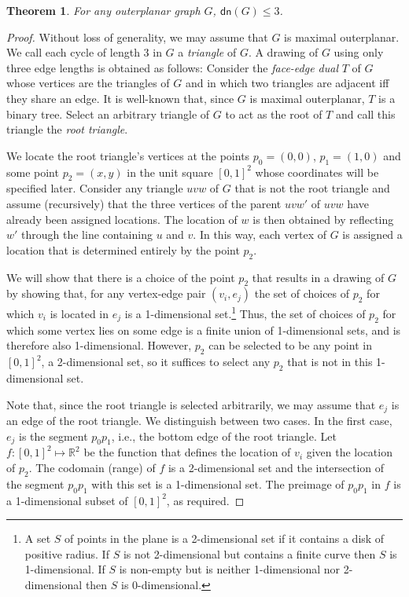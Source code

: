 \documentclass{article}
\newtheorem{thm}{Theorem}
\newcommand{\dn}{\mathsf{dn}}
\begin{document}
\begin{thm}
For any outerplanar graph $G$, $\dn(G)\le 3$.
\end{thm}

\begin{proof} 

Without loss of generality, we may assume that $G$ is maximal
outerplanar.  We call each cycle of length 3 in $G$ a \emph{triangle}
of $G$.  A drawing of $G$ using only three edge lengths is obtained as
follows: Consider the \emph{face-edge dual} $T$ of $G$ whose vertices
are the triangles of $G$ and in which two triangles are adjacent iff
they share an edge.  It is well-known that, since $G$ is maximal
outerplanar, $T$ is a binary tree. Select an arbitrary triangle of
$G$ to act as the root of $T$ and call this triangle the \emph{root
triangle}.

We locate the root triangle's vertices at the points $p_0=(0,0)$,
$p_1=(1,0)$ and some point $p_2=(x,y)$ in the unit square $[0,1]^2$ whose
coordinates will be specified later.  Consider any triangle $uvw$ of
$G$ that is not the root triangle and assume (recursively) that the
three vertices of the parent $uvw'$ of $uvw$ have already been
assigned locations.  The location of $w$ is then obtained by
reflecting $w'$ through the line containing $u$ and $v$.  In this way,
each vertex of $G$ is assigned a location that is determined entirely
by the point $p_2$.

We will show that there is a choice of the point $p_2$ that results in
a drawing of $G$ by showing that, for any vertex-edge pair $(v_i,e_j)$
the set of choices of $p_2$ for which $v_i$ is located in $e_j$ is a
1-dimensional set.\footnote{A set $S$ of points in the plane is a
2-dimensional set if it contains a disk of positive radius.  If $S$ is
not 2-dimensional but contains a finite curve then $S$ is
1-dimensional.  If $S$ is non-empty but is neither 1-dimensional nor
2-dimensional then $S$ is $0$-dimensional.} Thus, the set of choices
of $p_2$ for which some vertex lies on some edge is a finite union of
1-dimensional sets, and is therefore also 1-dimensional.  However,
$p_2$ can be selected to be any point in $[0,1]^2$, a
2-dimensional set, so it suffices to select any $p_2$ that is not in
this 1-dimensional set.

Note that, since the root triangle is selected arbitrarily, we may
assume that $e_j$ is an edge of the root triangle.  We distinguish
between two cases.  In the first case, $e_j$ is the segment $p_0p_1$,
i.e., the bottom edge of the root triangle.  Let $f:[0,1]^2\mapsto
\mathbb{R}^2$ be the function that defines the location of $v_i$ given
the location of $p_2$.  The codomain (range) of $f$ is a 2-dimensional
set and the intersection of the segment $p_0p_1$ with this set is a
1-dimensional set. The preimage of $p_0p_1$ in $f$ is a 1-dimensional
subset of $[0,1]^2$, as required.


\end{proof}
\end{document}
